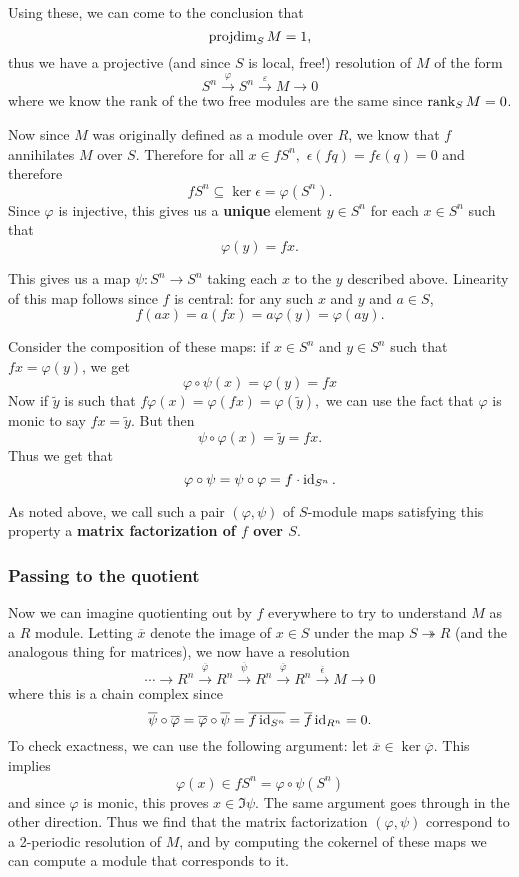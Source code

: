 \documentclass[12pt]{article}
\begin{document}
Using these, we can come to the conclusion that
\[\operatorname{projdim}_{S} M = 1,\]
thus we have a projective (and since $S$ is local, free!) resolution of $M$ of the form
\[S^n\xrightarrow{\varphi} S^n\xrightarrow{\varepsilon} M\to 0\]
where we know the rank of the two free modules are the same since $\operatorname{rank}_SM=0$.

Now since $M$ was originally defined as a module over $R$, we know that $f$ annihilates $M$ over $S$. Therefore for all $x\in fS^n,$ $\epsilon(fq)=f\epsilon(q)=0$
and therefore
\[f S^n\subseteq \ker\epsilon=\varphi(S^n).\]
Since $\varphi$ is injective, this gives us a \textbf{unique} element $y\in S^n$ for each $x\in S^n$ such that 
\[\varphi(y)=fx.\]

This gives us a map $\psi:S^n\to S^n$ taking each $x$ to the $y$ described above. Linearity of this map follows since $f$ is central: for any such $x$ and $y$ and $a\in S$,
\[f(ax)=a(fx)=a\varphi(y)=\varphi(ay).\]

Consider the composition of these maps: if $x\in S^n$ and $y\in S^n$ such that $fx=\varphi(y)$, we get
\[\varphi\circ\psi(x)=\varphi(y)=fx\]
Now if $\tilde y$ is such that $f\varphi(x)=\varphi(fx)=\varphi(\tilde y),$ we can use the fact that $\varphi$ is monic to say $fx=\tilde y$. But then
\[\psi\circ\varphi(x)=\tilde y=fx.\]
Thus we get that 
\[\varphi\circ\psi=\psi\circ\varphi=f\cdot\operatorname{id}_{S^n}.\]

As noted above, we call such a pair $(\varphi,\psi)$ of $S$-module maps satisfying this property a \textbf{matrix factorization of $f$ over $S$}.

\subsubsection{Passing to the quotient}
Now we can imagine quotienting out by $f$ everywhere to try to understand $M$ as a $R$ module. Letting $\overline x$ denote the image of $x\in S$ under the map $S\twoheadrightarrow R$ (and the analogous thing for matrices), we now have a resolution
\[\cdots\to R^n\xrightarrow{\overline\varphi}R^n\xrightarrow{\overline \psi}R^n\xrightarrow{\overline \varphi}R^n\xrightarrow{\overline\epsilon}M\to 0\]
where this is a chain complex since
\[\overline\psi\circ\overline\varphi=\overline\varphi\circ\overline\psi=\overline{f\operatorname{id}_{S^n}}=\overline{f}\operatorname{id}_{R^n}=0.\]
To check exactness, we can use the following argument: let $\overline x\in \ker\overline\varphi.$ This implies
\[\varphi(x)\in fS^n=\varphi\circ\psi(S^n)\]
and since $\varphi$ is monic, this proves $x\in \Im\psi.$ The same argument goes through in the other direction. Thus we find that the matrix factorization $(\varphi,\psi)$ correspond to a 2-periodic resolution of $M$, and by computing the cokernel of these maps we can compute a module that corresponds to it.
\end{document}

